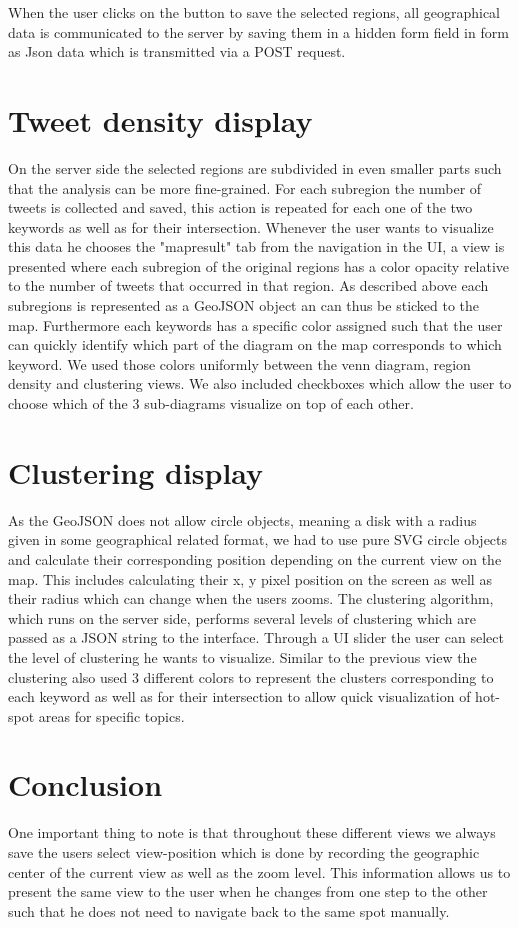 When the user clicks on the button to save the selected regions, all geographical data is communicated to the server by saving them in a hidden form field in form as Json data which is transmitted via a POST request.


\section{Tweet density display}

On the server side the selected regions are subdivided in even smaller parts such that the analysis can be more fine-grained. For each subregion the number of tweets is collected and saved, this action is repeated for each one of the two keywords as well as for their intersection.
Whenever the user wants to visualize this data he chooses the "mapresult" tab from the navigation in the UI, a view is presented where each subregion of the original regions has a color opacity relative to the number of tweets that occurred in that region. As described above each subregions is represented as a GeoJSON object an can thus be sticked to the map. Furthermore each keywords has a specific color assigned such that the user can quickly identify which part of the diagram on the map corresponds to which keyword. We used those colors uniformly between the venn diagram, region density and clustering views. We also included checkboxes which allow the user to choose which of the 3 sub-diagrams visualize on top of each other.


\section{Clustering display}

As the GeoJSON does not allow circle objects, meaning a disk with a radius given in some geographical related format, we had to use pure SVG circle objects and calculate their corresponding position depending on the current view on the map. This includes calculating their x, y pixel position on the screen as well as their radius which can change when the users zooms. The clustering algorithm, which runs on the server side, performs several levels of clustering which are passed as a JSON string to the interface. Through a UI slider the user can select the level of clustering he wants to visualize. Similar to the previous view the clustering also used 3 different colors to represent the clusters corresponding to each keyword as well as for their intersection to allow quick visualization of hot-spot areas for specific topics.

\section{Conclusion}
One important thing to note is that throughout these different views we always save the users select view-position which is done by recording the geographic center of the current view as well as the zoom level. This information allows us to present the same view to the user when he changes from one step to the other such that he does not need to navigate back to the same spot manually.
